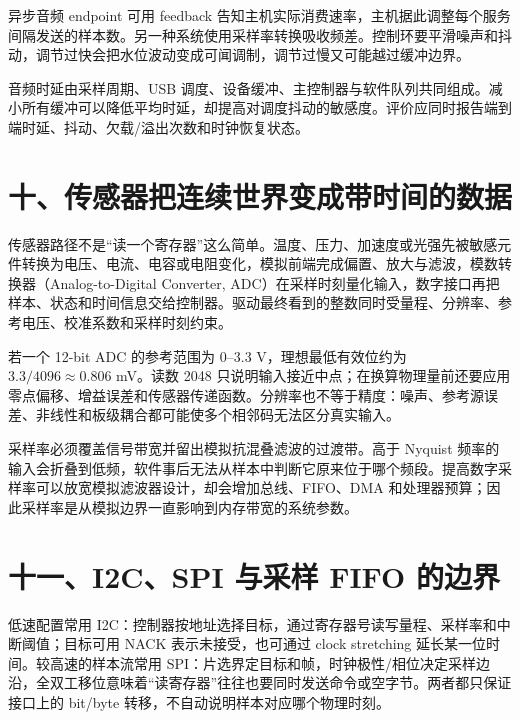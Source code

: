 异步音频 endpoint 可用 feedback 告知主机实际消费速率，主机据此调整每个服务间隔发送的样本数。另一种系统使用采样率转换吸收频差。控制环要平滑噪声和抖动，调节过快会把水位波动变成可闻调制，调节过慢又可能越过缓冲边界。

音频时延由采样周期、USB 调度、设备缓冲、主控制器与软件队列共同组成。减小所有缓冲可以降低平均时延，却提高对调度抖动的敏感度。评价应同时报告端到端时延、抖动、欠载/溢出次数和时钟恢复状态。




























\section{十、传感器把连续世界变成带时间的数据}

传感器路径不是“读一个寄存器”这么简单。温度、压力、加速度或光强先被敏感元件转换为电压、电流、电容或电阻变化，模拟前端完成偏置、放大与滤波，模数转换器（Analog-to-Digital Converter, ADC）在采样时刻量化输入，数字接口再把样本、状态和时间信息交给控制器。驱动最终看到的整数同时受量程、分辨率、参考电压、校准系数和采样时刻约束。

若一个 12-bit ADC 的参考范围为 0--3.3 V，理想最低有效位约为 $3.3/4096\approx0.806$ mV。读数 2048 只说明输入接近中点；在换算物理量前还要应用零点偏移、增益误差和传感器传递函数。分辨率也不等于精度：噪声、参考源误差、非线性和板级耦合都可能使多个相邻码无法区分真实输入。

采样率必须覆盖信号带宽并留出模拟抗混叠滤波的过渡带。高于 Nyquist 频率的输入会折叠到低频，软件事后无法从样本中判断它原来位于哪个频段。提高数字采样率可以放宽模拟滤波器设计，却会增加总线、FIFO、DMA 和处理器预算；因此采样率是从模拟边界一直影响到内存带宽的系统参数。

\section{十一、I2C、SPI 与采样 FIFO 的边界}

低速配置常用 I2C：控制器按地址选择目标，通过寄存器号读写量程、采样率和中断阈值；目标可用 NACK 表示未接受，也可通过 clock stretching 延长某一位时间。较高速的样本流常用 SPI：片选界定目标和帧，时钟极性/相位决定采样边沿，全双工移位意味着“读寄存器”往往也要同时发送命令或空字节。两者都只保证接口上的 bit/byte 转移，不自动说明样本对应哪个物理时刻。

